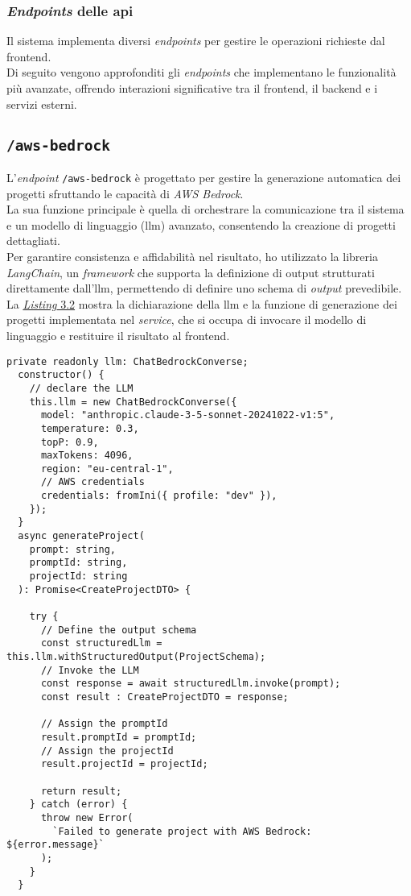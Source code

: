 \subsubsection{\textit{Endpoints} delle \gls{api}}

Il sistema implementa diversi \textit{endpoints} per gestire le operazioni richieste dal \gls{frontend}.\\
Di seguito vengono approfonditi gli \textit{endpoints} che implementano le funzionalità più avanzate, offrendo interazioni significative tra il \gls{frontend}, il \gls{backend} e i servizi esterni.

\subsection*{\texttt{/aws-bedrock}}
L’\textit{endpoint} \texttt{/aws-bedrock} è progettato per gestire la generazione automatica dei progetti sfruttando le capacità di \textit{AWS Bedrock}.\\
La sua funzione principale è quella di orchestrare la comunicazione tra il sistema e un modello di linguaggio (\gls{llm}) avanzato, consentendo la creazione di progetti dettagliati.\\

\noindent Per garantire consistenza e affidabilità nel risultato, ho utilizzato la libreria \textit{LangChain}, un \textit{framework} che supporta la definizione di output strutturati direttamente dall’\gls{llm},
permettendo di definire uno schema di \textit{output} prevedibile.\\

\pagebreak
\noindent La {\hyperref[lst:funzione-generazione-progetto]{\textit{Listing} 3.2}} mostra la dichiarazione della \gls{llm} e la funzione di generazione dei progetti implementata nel \textit{service}, che si occupa di invocare il modello di linguaggio e restituire il risultato al \gls{frontend}.

\begin{lstlisting}[caption={Dichiarazione \gls{llm} e sua invocazione}, label={lst:funzione-generazione-progetto}]
private readonly llm: ChatBedrockConverse;
  constructor() {  
    // declare the LLM
    this.llm = new ChatBedrockConverse({
      model: "anthropic.claude-3-5-sonnet-20241022-v1:5",
      temperature: 0.3,
      topP: 0.9,
      maxTokens: 4096,
      region: "eu-central-1",
      // AWS credentials
      credentials: fromIni({ profile: "dev" }), 
    });
  }
  async generateProject(
    prompt: string,
    promptId: string,
    projectId: string
  ): Promise<CreateProjectDTO> {

    try {
      // Define the output schema
      const structuredLlm = this.llm.withStructuredOutput(ProjectSchema); 
      // Invoke the LLM
      const response = await structuredLlm.invoke(prompt); 
      const result : CreateProjectDTO = response;

      // Assign the promptId
      result.promptId = promptId; 
      // Assign the projectId
      result.projectId = projectId; 

      return result;
    } catch (error) {
      throw new Error(
        `Failed to generate project with AWS Bedrock: ${error.message}`
      );
    }
  }
\end{lstlisting}
\pagebreak
